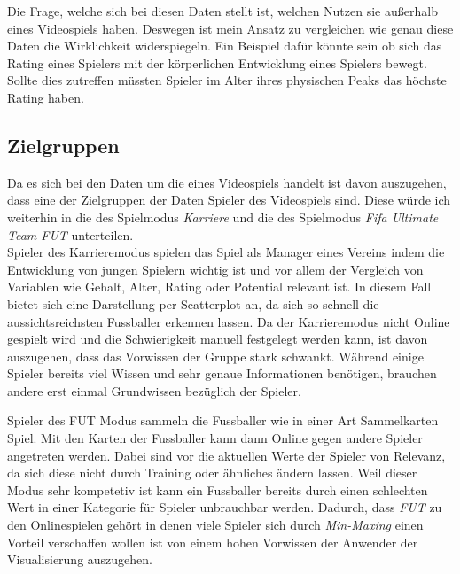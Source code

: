 \documentclass[usegeometry=true]{scrartcl}
\begin{document}
Die Frage, welche sich bei diesen Daten stellt ist, welchen Nutzen sie außerhalb eines Videospiels haben. Deswegen ist mein Ansatz zu vergleichen wie genau diese Daten die Wirklichkeit widerspiegeln. Ein Beispiel dafür könnte sein ob sich das Rating eines Spielers mit der körperlichen Entwicklung eines Spielers bewegt. Sollte dies zutreffen  müssten Spieler im Alter ihres physischen Peaks das höchste Rating haben. 
\subsection{Zielgruppen}
Da es sich bei den Daten um die eines Videospiels handelt ist davon auszugehen, dass eine der Zielgruppen der Daten Spieler des Videospiels sind. Diese würde ich weiterhin in die des Spielmodus \textit{Karriere} und die des Spielmodus \textit{Fifa Ultimate Team  FUT} unterteilen.\\

Spieler des Karrieremodus spielen das Spiel als Manager eines Vereins indem die Entwicklung von jungen Spielern wichtig ist und vor allem der Vergleich von Variablen wie Gehalt, Alter, Rating oder Potential relevant ist. In diesem Fall bietet sich eine Darstellung per Scatterplot an, da sich so schnell die aussichtsreichsten Fussballer erkennen lassen. Da der Karrieremodus nicht Online gespielt wird und die Schwierigkeit manuell festgelegt werden kann, ist davon auszugehen, dass das Vorwissen der Gruppe stark schwankt. Während einige Spieler bereits viel Wissen und sehr genaue Informationen benötigen, brauchen andere erst einmal Grundwissen bezüglich der Spieler.

Spieler des FUT Modus sammeln die Fussballer wie in einer Art Sammelkarten Spiel. Mit den Karten der Fussballer kann dann Online gegen andere Spieler angetreten werden. Dabei sind vor die aktuellen Werte der Spieler von Relevanz, da sich diese nicht durch Training oder ähnliches ändern lassen. Weil dieser Modus sehr kompetetiv ist kann ein Fussballer bereits durch einen schlechten Wert in einer Kategorie für Spieler unbrauchbar werden. Dadurch, dass \textit{FUT} zu den Onlinespielen gehört in denen viele Spieler sich durch \textit{Min-Maxing}\cite{noauthor_min-maxing_2014} einen Vorteil verschaffen wollen ist von einem hohen Vorwissen der Anwender der Visualisierung auszugehen.  
\end{document}
